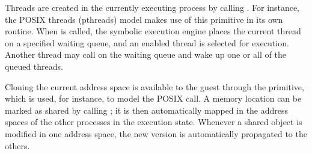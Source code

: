 Threads are created in the currently executing process by calling .  For instance, the POSIX threads (pthreads) model makes use of this primitive in its own  routine.
%
When  is called, the symbolic execution engine places the current thread on a specified waiting queue, and an enabled thread is selected for execution.
%
Another thread may call  on the waiting queue and wake up one or all of the queued threads.

Cloning the current address space is available to the guest through the  primitive, which is used, for instance, to model the POSIX  call.
%
A memory location can be marked as shared by calling ; it is then automatically mapped in the address spaces of the other processes in the execution state.  Whenever a shared object is modified in one address space, the new version is automatically propagated to the others.


